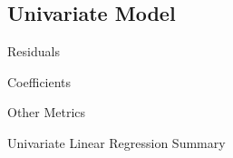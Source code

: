 \documentclass[11pt,a4paper]{article}
\begin{document}
\subsection{Univariate Model}
\begin{table}[H]
    \centering
    \begin{subtable}{.7\linewidth}
        \centering
        \caption{Residuals}
    \end{subtable}%

    \vspace{1em} %

    \begin{subtable}{.7\linewidth}
        \centering
        \caption{Coefficients}
    \end{subtable}%

    \vspace{1em}

    

    \vspace{1em} %

    \begin{subtable}{.7\linewidth}
        \centering
        \caption{Other Metrics}
    \end{subtable}

    \caption{Univariate Linear Regression Summary}
    \label{table: p1}
\end{table}
\end{document}
